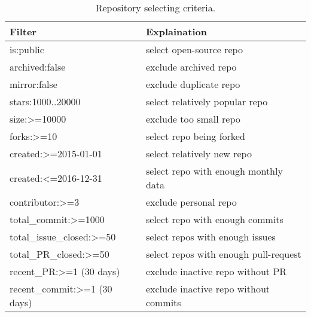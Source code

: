 \documentclass[sigconf,anonymous,review]{acmart}
\begin{document}
\begin{table}[!b]
\caption{Repository selecting criteria.}
\label{tbl:select}
\begin{adjustbox}{max width=0.48\textwidth}
\begin{tabular}{l|l}
\rowcolor[HTML]{BDBDBD} 
{\color[HTML]{000000} Filter} & {\color[HTML]{000000} Explaination} \\ \hline
\rowcolor[HTML]{FFFFFF} 
{\color[HTML]{000000} is:public} & {\color[HTML]{000000} select open-source repo} \\
\rowcolor[HTML]{F3F3F3} 
{\color[HTML]{000000} archived:false} & {\color[HTML]{000000} exclude archived repo} \\
\rowcolor[HTML]{FFFFFF} 
{\color[HTML]{000000} mirror:false} & {\color[HTML]{000000} exclude duplicate repo} \\
\rowcolor[HTML]{F3F3F3} 
{\color[HTML]{000000} stars:1000..20000} & {\color[HTML]{000000} select relatively popular repo} \\
\rowcolor[HTML]{FFFFFF} 
{\color[HTML]{000000} size:\textgreater{}=10000} & {\color[HTML]{000000} exclude too small repo} \\
\rowcolor[HTML]{F3F3F3} 
{\color[HTML]{000000} forks:\textgreater{}=10} & {\color[HTML]{000000} select repo being forked} \\
\rowcolor[HTML]{FFFFFF} 
{\color[HTML]{000000} created:\textgreater{}=2015-01-01} & {\color[HTML]{000000} select relatively new repo} \\
\rowcolor[HTML]{F3F3F3} 
{\color[HTML]{000000} created:\textless{}=2016-12-31} & {\color[HTML]{000000} select repo with enough monthly data} \\
\rowcolor[HTML]{FFFFFF} 
{\color[HTML]{000000} contributor:\textgreater{}=3} & {\color[HTML]{000000} exclude personal repo} \\
\rowcolor[HTML]{F3F3F3} 
{\color[HTML]{000000} total\_commit:\textgreater{}=1000} & {\color[HTML]{000000} select repo with enough commits} \\
\rowcolor[HTML]{FFFFFF} 
{\color[HTML]{000000} total\_issue\_closed:\textgreater{}=50} & {\color[HTML]{000000} select repos with enough issues} \\
\rowcolor[HTML]{F3F3F3} 
{\color[HTML]{000000} total\_PR\_closed:\textgreater{}=50} & {\color[HTML]{000000} select repos with enough pull-request} \\
\rowcolor[HTML]{FFFFFF} 
{\color[HTML]{000000} recent\_PR:\textgreater{}=1 (30 days)} & {\color[HTML]{000000} exclude inactive repo without PR} \\
\rowcolor[HTML]{F3F3F3} 
{\color[HTML]{000000} recent\_commit:\textgreater{}=1 (30 days)} & {\color[HTML]{000000} exclude inactive repo without commits}
\end{tabular}
\end{adjustbox}
\end{table}
\end{document}
